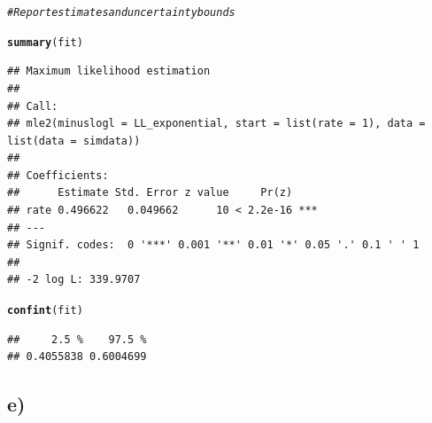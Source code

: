 \documentclass[12pt]{article}\usepackage[]{graphicx}\usepackage[]{color}
\makeatletter
\newcommand{\hlcom}[1]{\textcolor[rgb]{0.678,0.584,0.686}{\textit{#1}}}%
\newcommand{\hlstd}[1]{\textcolor[rgb]{0.345,0.345,0.345}{#1}}%
\newcommand{\hlkwd}[1]{\textcolor[rgb]{0.737,0.353,0.396}{\textbf{#1}}}%
\newenvironment{kframe}{%
 \def\at@end@of@kframe{}%
 \ifinner\ifhmode%
  \def\at@end@of@kframe{\end{minipage}}%
  \begin{minipage}{\columnwidth}%
 \fi\fi%
 \def\FrameCommand##1{\hskip\@totalleftmargin \hskip-\fboxsep
 \colorbox{shadecolor}{##1}\hskip-\fboxsep
     \hskip-\linewidth \hskip-\@totalleftmargin \hskip\columnwidth}%
 \MakeFramed {\advance\hsize-\width
   \@totalleftmargin\z@ \linewidth\hsize
   \@setminipage}}%
 {\par\unskip\endMakeFramed%
 \at@end@of@kframe}
\newenvironment{knitrout}{}{} %
\makeatother
\begin{document}
\begin{knitrout}
\color{fgcolor}\begin{kframe}
\begin{alltt}
\hlcom{# Report estimates and uncertainty bounds}

\hlkwd{summary}\hlstd{(fit)}
\end{alltt}
\begin{verbatim}
## Maximum likelihood estimation
## 
## Call:
## mle2(minuslogl = LL_exponential, start = list(rate = 1), data = list(data = simdata))
## 
## Coefficients:
##      Estimate Std. Error z value     Pr(z)    
## rate 0.496622   0.049662      10 < 2.2e-16 ***
## ---
## Signif. codes:  0 '***' 0.001 '**' 0.01 '*' 0.05 '.' 0.1 ' ' 1
## 
## -2 log L: 339.9707
\end{verbatim}
\begin{alltt}
\hlkwd{confint}\hlstd{(fit)}
\end{alltt}
\begin{verbatim}
##     2.5 %    97.5 % 
## 0.4055838 0.6004699
\end{verbatim}
\end{kframe}
\end{knitrout}

\subsection*{e)}
\end{document}
